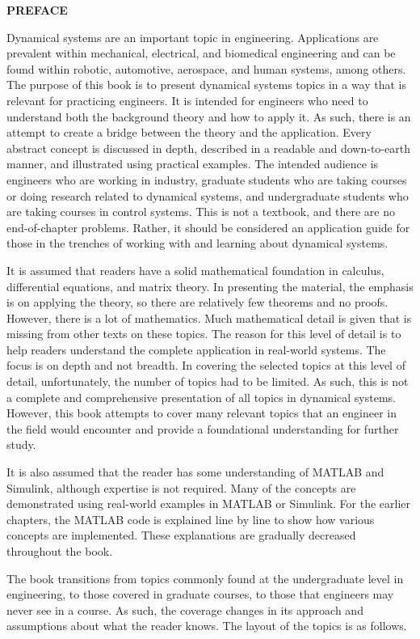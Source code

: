 \documentclass[12pt]{article}
\begin{document}
\textbf{PREFACE}

\hfill

Dynamical systems are an important topic in engineering. Applications are
prevalent within mechanical, electrical, and biomedical engineering and can
be found within robotic, automotive, aerospace, and human systems,
among others. The purpose of this book is to present dynamical systems
topics in a way that is relevant for practicing engineers. It is intended for
engineers who need to understand both the background theory and how to
apply it. As such, there is an attempt to create a bridge between the theory
and the application. Every abstract concept is discussed in depth, described
in a readable and down-to-earth manner, and illustrated using practical
examples. The intended audience is engineers who are working in industry,
graduate students who are taking courses or doing research related to
dynamical systems, and undergraduate students who are taking courses in
control systems. This is not a textbook, and there are no end-of-chapter
problems. Rather, it should be considered an application guide for those in
the trenches of working with and learning about dynamical systems.

It is assumed that readers have a solid mathematical foundation in calculus,
differential equations, and matrix theory. In presenting the material,
the emphasis is on applying the theory, so there are relatively few theorems
and no proofs. However, there is a lot of mathematics. Much mathematical
detail is given that is missing from other texts on these topics. The reason
for this level of detail is to help readers understand the complete application
in real-world systems. The focus is on depth and not breadth. In covering
the selected topics at this level of detail, unfortunately, the number of topics
had to be limited. As such, this is not a complete and comprehensive
presentation of all topics in dynamical systems. However, this book attempts
to cover many relevant topics that an engineer in the field would
encounter and provide a foundational understanding for further study.

It is also assumed that the reader has some understanding of MATLAB
and Simulink, although expertise is not required. Many of the concepts are
demonstrated using real-world examples in MATLAB or Simulink. For the
earlier chapters, the MATLAB code is explained line by line to show how
various concepts are implemented. These explanations are gradually
decreased throughout the book.

The book transitions from topics commonly found at the undergraduate
level in engineering, to those covered in graduate courses, to those that engineers
may never see in a course. As such, the coverage changes in its approach and
assumptions about what the reader knows. The layout of the topics is as follows.
\end{document}
